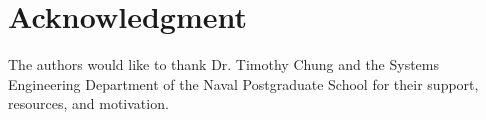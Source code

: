 \documentclass[10pt]{./IEEEtran}
\begin{document}
\newpage
\section*{Acknowledgment}
The authors would like to thank Dr. Timothy Chung and the Systems Engineering Department of the Naval Postgraduate School for their support, resources, and motivation.




\end{document}
